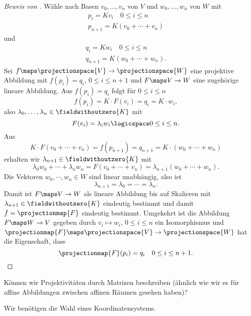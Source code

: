 \begin{proof}[Beweis von ]
  Wähle nach  Basen \( v_0,\dotsc,v_n \) von \( V \) und \( w_0,\dotsc,w_n \) von \( W \) mit
  \begin{gather*}
    p_i=Kv_i\quad 0\leq i\leq n\\
    p_{n+1}=K(v_0+\dotsb+v_n)
  \end{gather*}
  und
  \begin{gather*}
    q_i=Kw_i\quad 0\leq i\leq n\\
    q_{n+1}=K(w_0+\dotsb+w_n).
  \end{gather*}
  Sei \( f\maps \projectionspace{V}\to\projectionspace{W} \) eine projektive Abbildung mit \( f(p_i)=q_i \), \( 0\leq i\leq n+1 \) und \( F\maps V\to W  \) eine zugehörige lineare Abbildung. Aus \( f(p_i)=q_i \) folgt für \( 0\leq i\leq n \)
  \begin{equation*}
    f(p_i)=K\cdot F(v_i)=q_i=K\cdot w_i,
  \end{equation*}
  also \texists \( \lambda_0,\dotsc,\lambda_n\in \fieldwithoutzero{K} \) mit
  \begin{equation*}
    F(v_i)=\lambda_i w_i\logicspace 0\leq i\leq n.
  \end{equation*}
  Aus 
  \begin{equation*}
    K\cdot F(v_0+\dotsb+v_n)=f(p_{n+1})=q_{n+1}=K\cdot (w_0+\dotsb+w_{n})
  \end{equation*}
  erhalten wir \( \lambda_{n+1}\in \fieldwithoutzero{K} \) mit
  \begin{equation*}
    \lambda_0 w_0+\dotsb+\lambda_n w_n = F(v_0+\dotsb+v_n)=\lambda_{n+1}(w_0+\dotsb+w_n).
  \end{equation*}
  Die Vektoren \( w_0,\dotsb,w_n\in W \) sind linear unabhängig, also ist
  \begin{equation*}
    \lambda_{n+1}=\lambda_0=\dotsb=\lambda_n.
  \end{equation*}
  Damit ist \( F\maps V\to W  \) als lineare Abbildung bis auf Skalieren mit \( \lambda_{n+1}\in \fieldwithoutzero{K} \) eindeutig bestimmt und damit \( f=\projectionmap{F} \) eindeutig bestimmt. Umgekehrt ist die Abbildung \( F\maps W\to V \) gegeben durch \( v_i\mapsto w_i \), \( 0\leq i\leq n \) ein Isomorphismus und \( \projectionmap{F}\maps \projectionspace{V}\to \projectionspace{W} \) hat die Eigenschaft, dass
  \begin{equation*}
    \projectionmap{F}(p_i)=q_i\quad 0\leq i\leq n+1.
  \end{equation*}
\end{proof}
\begin{frage*}
  Können wir Projektivitäten durch Matrizen beschreiben (ähnlich wie wir es für affine Abbildungen zwischen affinen Räumen gesehen haben)?
\end{frage*}
\tto Wir benötigen die Wahl eines Koordinatensystems.

